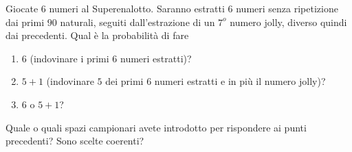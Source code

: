 \Esercizio{}

Giocate $6$ numeri al Superenalotto. Saranno estratti $6$ numeri senza ripetizione dai primi $90$ naturali, seguiti dall'estrazione di un $7^{o}$ numero jolly, diverso quindi dai precedenti. Qual è la probabilità di fare
\begin{enumerate}
	\item $6$ (indovinare i primi $6$ numeri estratti)?
	\item $5+1$ (indovinare $5$ dei primi $6$ numeri estratti e in più il numero jolly)?
	\item $6$ o $5+1$?
\end{enumerate}

Quale o quali spazi campionari avete introdotto per rispondere ai punti precedenti? Sono scelte coerenti?

\Esercizio{}


